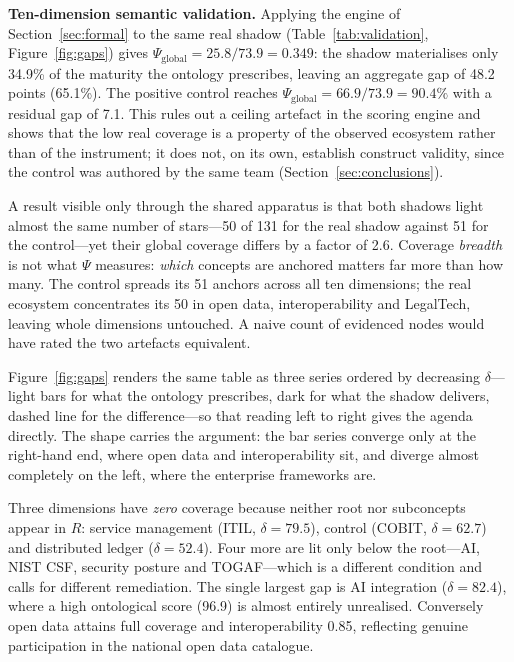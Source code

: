 \documentclass[engproc,proceedingpaper,submit,moreauthors]{Definitions/mdpi}
\begin{document}
\textbf{Ten-dimension semantic validation.} Applying the engine of Section~\ref{sec:formal} to the same real shadow (Table~\ref{tab:validation}, Figure~\ref{fig:gaps}) gives $\Psi_{\mathrm{global}}=25.8/73.9=\mathbf{0.349}$: the shadow materialises only 34.9\% of the maturity the ontology prescribes, leaving an aggregate gap of 48.2 points (65.1\%). The positive control reaches $\Psi_{\mathrm{global}}=66.9/73.9=90.4\%$ with a residual gap of 7.1. This rules out a ceiling artefact in the scoring engine and shows that the low real coverage is a property of the observed ecosystem rather than of the instrument; it does not, on its own, establish construct validity, since the control was authored by the same team (Section~\ref{sec:conclusions}).

A result visible only through the shared apparatus is that both shadows light almost the same number of stars---50 of 131 for the real shadow against 51 for the control---yet their global coverage differs by a factor of 2.6. Coverage \emph{breadth} is not what $\Psi$ measures: \emph{which} concepts are anchored matters far more than how many. The control spreads its 51 anchors across all ten dimensions; the real ecosystem concentrates its 50 in open data, interoperability and LegalTech, leaving whole dimensions untouched. A naive count of evidenced nodes would have rated the two artefacts equivalent.

Figure~\ref{fig:gaps} renders the same table as three series ordered by decreasing $\delta$---light bars for what the ontology prescribes, dark for what the shadow delivers, dashed line for the difference---so that reading left to right gives the agenda directly. The shape carries the argument: the bar series converge only at the right-hand end, where open data and interoperability sit, and diverge almost completely on the left, where the enterprise frameworks are.

Three dimensions have \emph{zero} coverage because neither root nor subconcepts appear in $R$: service management (ITIL, $\delta=79.5$), control (COBIT, $\delta=62.7$) and distributed ledger ($\delta=52.4$). Four more are lit only below the root---AI, NIST CSF, security posture and TOGAF---which is a different condition and calls for different remediation. The single largest gap is AI integration ($\delta=82.4$), where a high ontological score (96.9) is almost entirely unrealised. Conversely open data attains full coverage and interoperability 0.85, reflecting genuine participation in the national open data catalogue.
\end{document}
